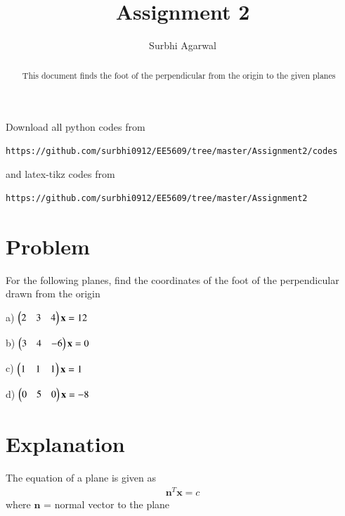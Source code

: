 \documentclass[journal,12pt,twocolumn]{IEEEtran}
\begin{document}
\let\StandardTheFigure\thefigure
\let\vec\mathbf

\renewcommand{\thefigure}{\theproblem}

\def\putbox#1#2#3{\makebox[0in][l]{\makebox[#1][l]{}\raisebox{\baselineskip}[0in][0in]{\raisebox{#2}[0in][0in]{#3}}}}
     \def\rightbox#1{\makebox[0in][r]{#1}}
     \def\centbox#1{\makebox[0in]{#1}}
     \def\topbox#1{\raisebox{-\baselineskip}[0in][0in]{#1}}
     \def\midbox#1{\raisebox{-0.5\baselineskip}[0in][0in]{#1}}
\vspace{3cm}

\title{Assignment 2}
\author{Surbhi Agarwal}

\maketitle

\newpage


\bigskip

\renewcommand{\thefigure}{\theenumi}
\renewcommand{\thetable}{\theenumi}

\begin{abstract}
This document finds the foot of the perpendicular from the origin to the given planes
\end{abstract}

Download all python codes from 
%
\begin{lstlisting}
https://github.com/surbhi0912/EE5609/tree/master/Assignment2/codes\end{lstlisting}
%
and latex-tikz codes from 
%
\begin{lstlisting}
https://github.com/surbhi0912/EE5609/tree/master/Assignment2
\end{lstlisting}
%
\section{Problem}
For the following planes, find the coordinates of the foot of the perpendicular drawn from the origin

a) $\myvec{2&3&4}\vec{x} = 12$

b) $\myvec{3&4&-6}\vec{x} = 0$

c) $\myvec{1&1&1}\vec{x} = 1$

d) $\myvec{0&5&0}\vec{x} = -8$
\section{Explanation}
The equation of a plane is given as
\begin{align}\label{e1}
    \vec{n}^T\vec{x} = c
\end{align}
where $\vec{n}$ = normal vector to the plane
\end{document}
